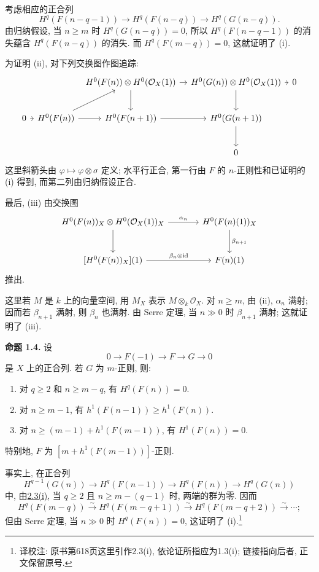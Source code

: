 考虑相应的正合列
\[
  H^q(F(n-q-1))\longrightarrow H^q(F(n-q))
  \longrightarrow H^q(G(n-q)).
\]
由归纳假设, 当 \(n\geq m\) 时 \(H^q(G(n-q))=0\), 所以 \(H^q(F(n-q-1))\) 的消失蕴含 \(H^q(F(n-q))\) 的消失. 而 \(H^q(F(m-q))=0\), 这就证明了 (i).

为证明 (ii), 对下列交换图作图追踪:
\[
\begin{tikzcd}[column sep=.45em,row sep=2.4em]
  & & H^0(F(n))\otimes H^0(\mathcal O_X(1))
      \arrow[rr] \arrow[d]
  & & H^0(G(n))\otimes H^0(\mathcal O_X(1))
      \arrow[r] \arrow[d]
  & 0 \\
  0 \arrow[r]
  & H^0(F(n)) \arrow[ur] \arrow[r]
  & H^0(F(n+1)) \arrow[rr]
  & & H^0(G(n+1)) \arrow[d] \\
  & & & & 0
\end{tikzcd}
\]
这里斜箭头由 \(\varphi\mapsto\varphi\otimes\sigma\) 定义; 水平行正合, 第一行由 \(F\) 的 \(n\)-正则性和已证明的 (i) 得到, 而第二列由归纳假设正合.

最后, (iii) 由交换图
\[
\begin{tikzcd}[column sep=large,row sep=large]
H^0(F(n))_X\otimes H^0(\mathcal O_X(1))_X
  \arrow[r,"\alpha_n"]
  \arrow[d]
& H^0(F(n)(1))_X
  \arrow[d,"\beta_{n+1}"] \\
{[H^0(F(n))_X](1)}
  \arrow[r,"\beta_n\otimes\mathrm{id}"]
& F(n)(1)
\end{tikzcd}
\]
推出.

这里若 \(M\) 是 \(k\) 上的向量空间, 用 \(M_X\) 表示 \(M\otimes_k\mathcal O_X\). 对 \(n\geq m\), 由 (ii), \(\alpha_n\) 满射; 因而若 \(\beta_{n+1}\) 满射, 则 \(\beta_n\) 也满射. 由 Serre 定理, 当 \(n\gg0\) 时 \(\beta_{n+1}\) 满射; 这就证明了 (iii).

\textbf{命题 1.4.} 设
\[
  0\longrightarrow F(-1)\longrightarrow F\longrightarrow G\longrightarrow0
\]
是 \(X\) 上的正合列. 若 \(G\) 为 \(m\)-正则, 则:
\begin{enumerate}[label=(\roman*)]
\item 对 \(q\geq2\) 和 \(n\geq m-q\), 有 \(H^q(F(n))=0\).
\item 对 \(n\geq m-1\), 有 \(h^1(F(n-1))\geq h^1(F(n))\).
\item 对 \(n\geq(m-1)+h^1(F(m-1))\), 有 \(H^1(F(n))=0\).
\end{enumerate}
特别地, \(F\) 为 \([m+h^1(F(m-1))]\)-正则.

事实上, 在正合列
\[
  H^{q-1}(G(n))\longrightarrow H^q(F(n-1))
  \longrightarrow H^q(F(n))\longrightarrow H^q(G(n))
\]
中, 由\hyperlink{sga6.e13.prop.1-3}{2.3(i)}, 当 \(q\geq2\) 且 \(n\geq m-(q-1)\) 时, 两端的群为零. 因而
\[
  H^q(F(m-q))\xrightarrow{\sim}H^q(F(m-q+1))
  \xrightarrow{\sim}H^q(F(m-q+2))\xrightarrow{\sim}\cdots;
\]
但由 Serre 定理, 当 \(n\gg0\) 时 \(H^q(F(n))=0\), 这证明了 (i).\footnote{译校注: 原书第618页这里引作2.3(i), 依论证所指应为1.3(i); 链接指向后者, 正文保留原号.}

